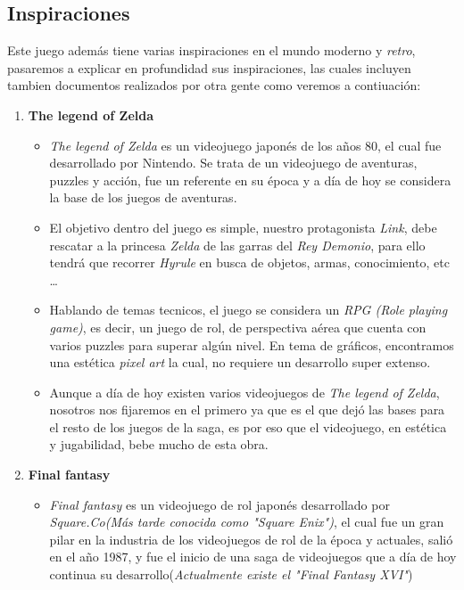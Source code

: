\documentclass[a4paper]{article}
\begin{document}
\subsection{Inspiraciones}
Este juego además tiene varias inspiraciones en el mundo moderno y \textit{retro}, pasaremos a explicar en profundidad sus inspiraciones, las cuales incluyen tambien documentos realizados por otra gente como veremos a contiuación:\\
\begin{enumerate}
    \item \textbf{The legend of Zelda}
          \begin{itemize}
              \item \textit{The legend of Zelda} es un videojuego japonés de los años 80, el cual fue desarrollado por Nintendo. Se trata de un videojuego de aventuras, puzzles y acción, fue un referente en su época y a día de hoy se considera la base de los juegos de aventuras.
              \item El objetivo dentro del juego es simple, nuestro protagonista \textit{Link}, debe rescatar a la princesa \textit{Zelda} de las garras del \textit{Rey Demonio}, para ello tendrá que recorrer \textit{Hyrule} en busca de objetos, armas, conocimiento, etc \dots
              \item Hablando de temas tecnicos, el juego se considera un \textit{RPG (Role playing game)}, es decir, un juego de rol, de perspectiva aérea que cuenta con varios puzzles para superar algún nivel. En tema de gráficos, encontramos una estética \textit{pixel art} la cual, no requiere un desarrollo super extenso.
              \item Aunque a día de hoy existen varios videojuegos de \textit{The legend of Zelda}, nosotros nos fijaremos en el primero ya que es el que dejó las bases para el resto de los juegos de la saga, es por eso que el videojuego, en estética y jugabilidad, bebe mucho de esta obra.
          \end{itemize}
    \item \textbf{Final fantasy}
          \begin{itemize}
              \item \textit{Final fantasy} es un videojuego de rol japonés desarrollado por \textit{Square.Co(Más tarde conocida como "Square Enix")}, el cual fue un gran pilar en la industria de los videojuegos de rol de la época y actuales, salió en el año 1987, y fue el inicio de una saga de videojuegos que a día de hoy continua su desarrollo(\textit{Actualmente existe el "Final Fantasy XVI"})

\end{itemize}
\end{enumerate}
\end{document}
